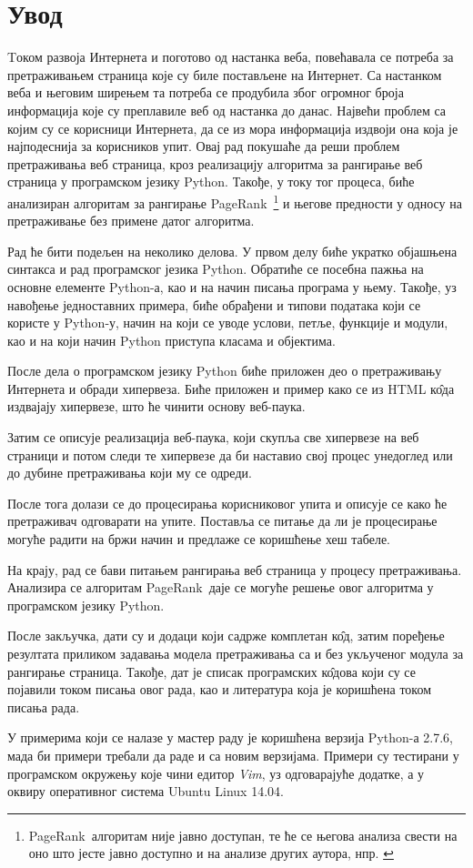 \section{Увод}
Tоком развоја Интернета и поготово од настанка веба, повећавала се потреба за претраживањем страница које су биле постављене на Интернет. Са настанком веба и његовим ширењем та потреба се продубила због огромног броја информација које су преплавиле веб од настанка до данас. Највећи проблем са којим су се корисници Интернета, да се из мора информација издвоји она која је најподеснија за корисников упит. Овај рад покушаће да реши проблем претраживања  веб страница, кроз реализацију алгоритма за рангирање веб страница у програмском језику Python. Такође, у току тог процеса, биће анализиран алгоритам за рангирање PageRank\texttrademark\ \footnote{PageRank\texttrademark\ алгоритам није јавно доступан, те ће се његова анализа свести на оно што јесте јавно доступно и на анализе других аутора, нпр. \cite{langville2011google}  }  и његове предности у односу на претраживање без примене датог алгоритма.

Рад ће бити подељен на неколико делова. У првом делу биће укратко објашњена синтакса и рад програмског језика Python. Обратиће се посебна пажња на основне елементе Python-а, као и на начин писања програма у њему. Такође, уз навођење једноставних примера, биће обрађени и типови података који се користе у Python-у, начин на који се уводе услови, петље, функције и модули, као и на који начин Python приступа класама и објектима.

После дела о програмском језику Python биће приложен део о претраживању Интернета и обради хипервеза. Биће приложен и пример како се из HTML к\^{о}да издвајају хипервезе, што ће чинити основу веб-паука.

Затим се описује реализација веб-паука, који скупља све хипервезе на веб страници и потом следи те хипервезе да би наставио свој процес унедоглед или до дубине претраживања који му се одреди.

После тога долази се до процесирања корисниковог упита и описује се како ће претраживач одговарати на упите. Поставља се питање да ли је процесирање могуће радити на бржи начин и предлаже се коришћење хеш табеле.

На крају, рад се бави питањем рангирања веб страница у процесу претраживања. Анализира се алгоритам PageRank\texttrademark\ даје се могуће решење овог алгоритма у програмском језику Python.

После закључка, дати су и додаци који садрже комплетан к\^{о}д, затим поређење резултата приликом задавања модела претраживања са и без укљученог модула за рангирање страница. Такође, дат је списак програмских к\^{о}дова који су се појавили током писања овог рада, као и литература која је коришћена током писања рада.

У примерима који се налазе у мастер раду је коришћена верзија Python-а 2.7.6, мада би примери требали да раде и са новим верзијама. Примери су тестирани у програмском окружењу које чини едитор \emph{Vim}, уз одговарајуће додатке, а у оквиру оперативног система Ubuntu Linux 14.04.
